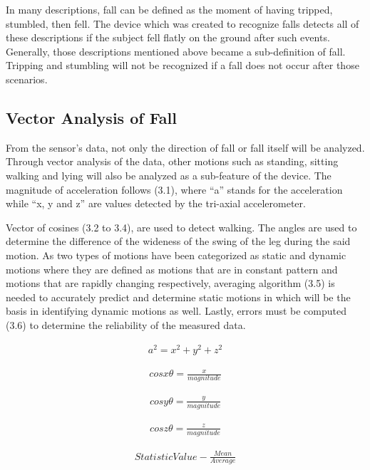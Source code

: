 In many descriptions, fall can be defined as the moment of having tripped, stumbled, then fell. The device which was created to recognize falls detects all of these descriptions if the subject fell flatly on the ground after such events. Generally, those descriptions mentioned above became a sub-definition of fall. Tripping and stumbling will not be recognized if a fall does not occur after those scenarios.

\subsection{Vector Analysis of Fall}

From the sensor’s data, not only the direction of fall or fall itself will be analyzed. Through vector analysis of the data, other motions such as standing, sitting walking and lying will also be analyzed as a sub-feature of the device. The magnitude of acceleration follows (3.1), where “a” stands for the acceleration while “x, y and z” are values detected by the tri-axial accelerometer.

Vector of cosines (3.2 to 3.4), are used to detect walking. The angles are used to determine the difference of the wideness of the swing of the leg during the said motion. As two types of motions have been categorized as static and dynamic motions where they are defined as motions that are in constant pattern and motions that are rapidly changing respectively, averaging algorithm (3.5) is needed to accurately predict and determine static motions in which will be the basis in identifying dynamic motions as well. Lastly, errors must be computed (3.6) to determine the reliability of the measured data.

\begin{eqnarray}  
a^2 = x^2 + y^2 + z^2
\end{eqnarray}

\begin{eqnarray}
cosx\theta = \frac{x}{magnitude} 
\end{eqnarray}

\begin{eqnarray}
cosy\theta = \frac{y}{magnitude} 
\end{eqnarray}

\begin{eqnarray}
cosz\theta = \frac{z}{magnitude} 
\end{eqnarray}

\begin{eqnarray}
Statistic Value - \frac{Mean}{Average}
\end{eqnarray}

